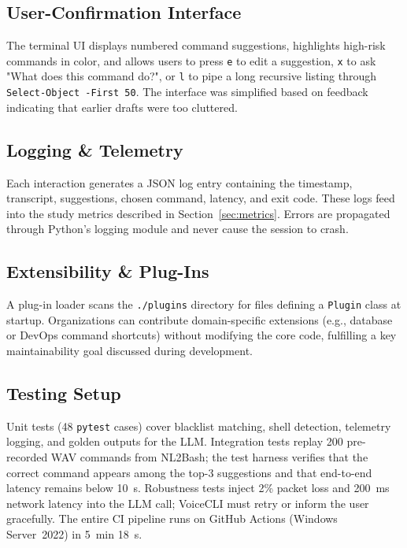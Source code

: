 \documentclass[a4paper,12pt]{article}
\begin{document}
\subsection{User-Confirmation Interface}
\label{sec:confirmation-ui}
\noindent The terminal UI displays numbered command suggestions, highlights high-risk commands in color, and allows users to press \texttt{e} to edit a suggestion, \texttt{x} to ask "What does this command do?", or \texttt{l} to pipe a long recursive listing through \texttt{Select-Object -First 50}. The interface was simplified based on feedback indicating that earlier drafts were too cluttered.

\subsection{Logging \& Telemetry}
\label{sec:logging}
\noindent Each interaction generates a JSON log entry containing the timestamp, transcript, suggestions, chosen command, latency, and exit code. These logs feed into the study metrics described in Section~\ref{sec:metrics}. Errors are propagated through Python's logging module and never cause the session to crash.

\subsection{Extensibility \& Plug-Ins}
\label{sec:plugins}
\noindent A plug-in loader scans the \texttt{./plugins} directory for files defining a \texttt{Plugin} class at startup. Organizations can contribute domain-specific extensions (e.g., database or DevOps command shortcuts) without modifying the core code, fulfilling a key maintainability goal discussed during development.

\subsection{Testing Setup}
\label{sec:testing}
\noindent Unit tests (48 \texttt{pytest} cases) cover blacklist matching, shell detection, telemetry logging, and golden outputs for the LLM. Integration tests replay 200 pre-recorded WAV commands from NL2Bash; the test harness verifies that the correct command appears among the top-3 suggestions and that end-to-end latency remains below 10~s. Robustness tests inject 2\% packet loss and 200~ms network latency into the LLM call; VoiceCLI must retry or inform the user gracefully. The entire CI pipeline runs on GitHub Actions (Windows Server~2022) in 5~min 18~s.
\end{document}
